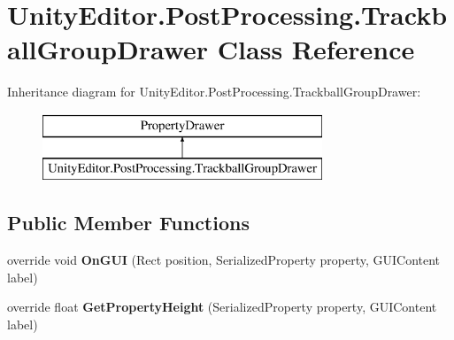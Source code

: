 \hypertarget{class_unity_editor_1_1_post_processing_1_1_trackball_group_drawer}{}\section{Unity\+Editor.\+Post\+Processing.\+Trackball\+Group\+Drawer Class Reference}
\label{class_unity_editor_1_1_post_processing_1_1_trackball_group_drawer}
Inheritance diagram for Unity\+Editor.\+Post\+Processing.\+Trackball\+Group\+Drawer\+:\begin{figure}[H]
\begin{center}
\leavevmode
\includegraphics[height=2.000000cm]{class_unity_editor_1_1_post_processing_1_1_trackball_group_drawer}
\end{center}
\end{figure}
\subsection*{Public Member Functions}
\begin{DoxyCompactItemize}
\item 
\mbox{\label{class_unity_editor_1_1_post_processing_1_1_trackball_group_drawer_a8d90fa1568d3c85d649dfcc4814e7433}} 
override void {\bfseries On\+G\+UI} (Rect position, Serialized\+Property property, G\+U\+I\+Content label)
\item 
\mbox{\label{class_unity_editor_1_1_post_processing_1_1_trackball_group_drawer_ad37342e5aad4e98329b8d41666db6d9a}} 
override float {\bfseries Get\+Property\+Height} (Serialized\+Property property, G\+U\+I\+Content label)
\end{DoxyCompactItemize}
